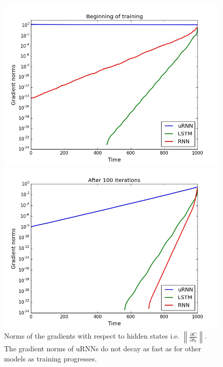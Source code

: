\documentclass{article} %
\newcommand\norm[1]{\left\lVert#1\right\rVert}
\begin{document}
\begin{figure}[t!] 
  \label{fig:gradnorms} 
  \begin{minipage}[b]{0.5\linewidth}
    \centering
    \includegraphics[scale=0.25]{figures/grads_0.jpeg}
  \end{minipage}%
  \begin{minipage}[b]{0.5\linewidth}
    \centering
    \includegraphics[scale=0.25]{figures/grads_100.jpeg}
  \end{minipage}
  \caption{Norms of the gradients with respect to hidden states i.e. 
   $\norm{\frac{\partial C}{\partial h_t}}$. The gradient norms of uRNNs do not decay
   as fast as for other models as training progresses.}
\end{figure}
\end{document}
